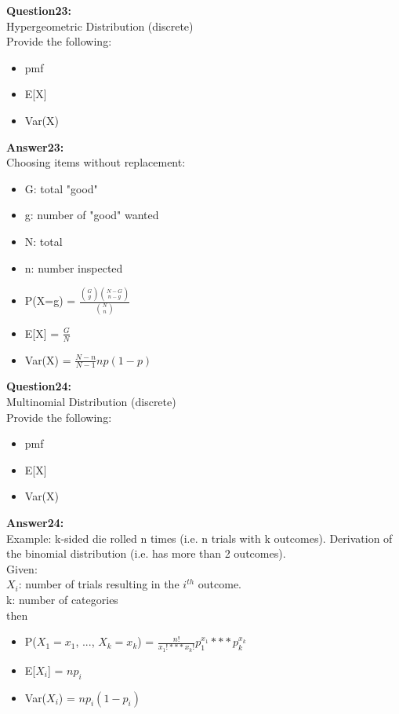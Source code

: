 \documentclass{article}
\begin{document}
\textbf{Question23:} \\
Hypergeometric Distribution (discrete)\\
Provide the following:
\begin{itemize}
	\item pmf
	\item E[X]
	\item Var(X)
\end{itemize}

\textbf{Answer23:} \\
Choosing items without replacement:
\begin{itemize}
	\item G: total "good"
	\item g: number of "good" wanted
	\item N: total
	\item n: number inspected
\end{itemize}

\begin{itemize}
	\item P(X=g) = $\frac
	{\binom{G}{g}\binom{N - G}{n - g}}
	{\binom{N}{n}}
	$
	\item E[X] = $\frac{G}{N}$
	\item Var(X) = $\frac{N - n}{N - 1}np(1 - p)$
\end{itemize}


\textbf{Question24:} \\
Multinomial Distribution (discrete)\\
Provide the following:
\begin{itemize}
	\item pmf
	\item E[X]
	\item Var(X)
\end{itemize}

\textbf{Answer24:} \\
Example: k-sided die rolled n times (i.e. n trials with k outcomes). Derivation of the binomial distribution (i.e. has more than 2 outcomes).\\
Given:\\
$X_i$: number of trials resulting in the $i^{th}$ outcome.\\
k: number of categories\\
then

\begin{itemize}
	\item P($X_1 = x_1$, ..., $X_k = x_k$) = $\frac{n!}{x_{1}! *** x_{k}!}p_{1}^{x_1} *** p_{k}^{x_k}$
	\item E[$X_i$] = $np_i$
	\item Var($X_i$) = $np_i(1-p_i)$
\end{itemize}
\end{document}

